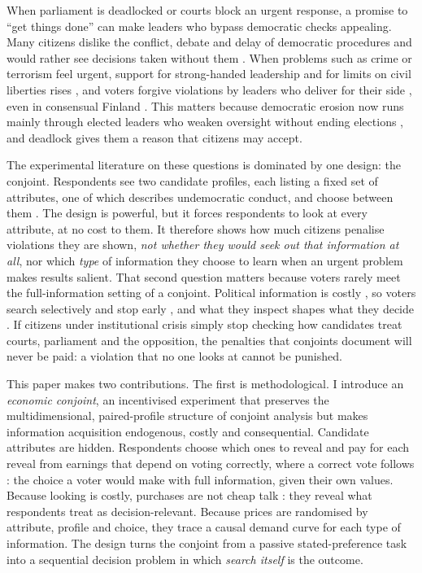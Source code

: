 \documentclass[11pt]{article}
\begin{document}
When parliament is deadlocked or courts block an urgent response, a promise to ``get things done'' can make leaders who bypass democratic checks appealing. Many citizens dislike the conflict, debate and delay of democratic procedures and would rather see decisions taken without them \parencite{HibbingTheissMorse2002}. When problems such as crime or terrorism feel urgent, support for strong-handed leadership and for limits on civil liberties rises \parencite{MerollaZechmeister2009,Visconti2020}, and voters forgive violations by leaders who deliver for their side \parencite{Svolik2019,GrahamSvolik2020}, even in consensual Finland \parencite{SaikkonenChristensen2023}. This matters because democratic erosion now runs mainly through elected leaders who weaken oversight without ending elections \parencite{Bermeo2016}, and deadlock gives them a reason that citizens may accept.

The experimental literature on these questions is dominated by one design: the conjoint. Respondents see two candidate profiles, each listing a fixed set of attributes, one of which describes undemocratic conduct, and choose between them \parencite{Hainmueller2014,GrahamSvolik2020}. The design is powerful, but it forces respondents to look at every attribute, at no cost to them. It therefore shows how much citizens penalise violations they are shown, \emph{not whether they would seek out that information at all}, nor which \emph{type} of information they choose to learn when an urgent problem makes results salient. That second question matters because voters rarely meet the full-information setting of a conjoint. Political information is costly \parencite{Downs1957}, so voters search selectively and stop early \parencite{Redlawsk2001,LauRedlawsk2006}, and what they inspect shapes what they decide \parencite{JenkeEtAl2021}. If citizens under institutional crisis simply stop checking how candidates treat courts, parliament and the opposition, the penalties that conjoints document will never be paid: a violation that no one looks at cannot be punished.

This paper makes two contributions. The first is methodological. I introduce an \emph{economic conjoint}, an incentivised experiment that preserves the multidimensional, paired-profile structure of conjoint analysis but makes information acquisition endogenous, costly and consequential. Candidate attributes are hidden. Respondents choose which ones to reveal and pay for each reveal from earnings that depend on voting correctly, where a correct vote follows \textcite{LauRedlawsk1997}: the choice a voter would make with full information, given their own values. Because looking is costly, purchases are not cheap talk \parencite{BullockEtAl2015}: they reveal what respondents treat as decision-relevant. Because prices are randomised by attribute, profile and choice, they trace a causal demand curve for each type of information. The design turns the conjoint from a passive stated-preference task into a sequential decision problem in which \emph{search itself} is the outcome.
\end{document}
